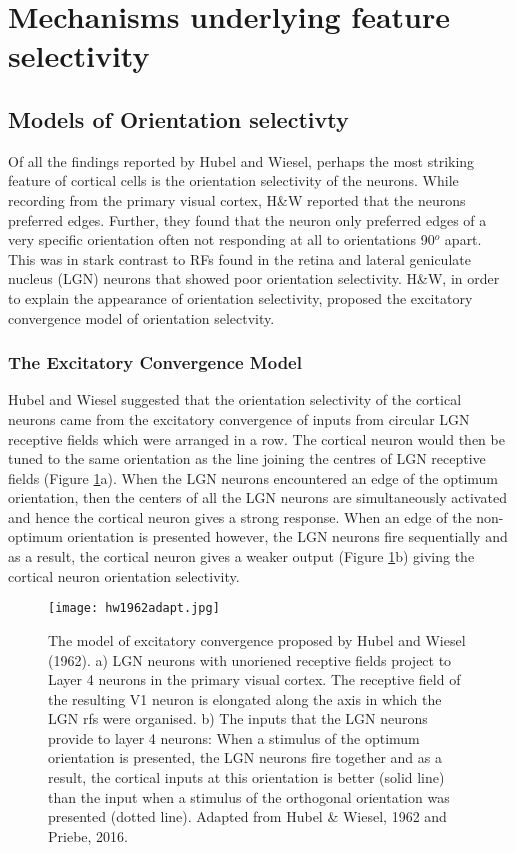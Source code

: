 \section{Mechanisms underlying feature selectivity}



\subsection{Models of Orientation selectivty}

Of all the findings reported by Hubel and Wiesel, perhaps the most striking feature of cortical cells is the orientation selectivity of the neurons. While recording from the primary visual cortex, H\&W reported that the neurons preferred edges. Further, they found that the neuron only preferred edges of a very specific orientation often not responding at all to orientations 90$^o$ apart. This was in stark contrast to RFs found in the retina and lateral geniculate nucleus (LGN) neurons that showed poor orientation selectivity. H\&W, in order to explain the appearance of orientation selectivity, proposed the excitatory convergence model of orientation selectvity.

\subsubsection{The Excitatory Convergence Model} Hubel and Wiesel suggested that the orientation selectivity of the cortical neurons came from the excitatory convergence of inputs from circular LGN receptive fields which were arranged in a row. The cortical neuron would then be tuned to the same orientation as the line joining the centres of LGN receptive fields (Figure \ref{fig:HW}a). When the LGN neurons encountered an edge of the optimum orientation, then the centers of all the LGN neurons are simultaneously activated and hence the cortical neuron gives a strong response. When an edge of the non-optimum orientation is presented however, the LGN neurons fire sequentially and as a result, the cortical neuron gives a weaker output (Figure \ref{fig:HW}b) giving the cortical neuron orientation selectivity.

	\begin{figure}[H]
	\centering
	\texttt{[image: hw1962adapt.jpg]}

	\caption{The model of excitatory convergence proposed by Hubel and Wiesel (1962). a) LGN neurons with unoriened receptive fields project to Layer 4 neurons in the primary visual cortex. The receptive field of the resulting V1 neuron is elongated along the axis in which the LGN rfs were organised. b) The inputs that the LGN neurons provide to layer 4 neurons: When a stimulus of the optimum orientation is presented, the LGN neurons fire together and as a result, the cortical inputs at this orientation is better (solid line) than the input when a stimulus of the orthogonal orientation was presented (dotted line). Adapted from Hubel \& Wiesel, 1962 and Priebe, 2016.}
	\label{fig:HW}
	\end{figure}

